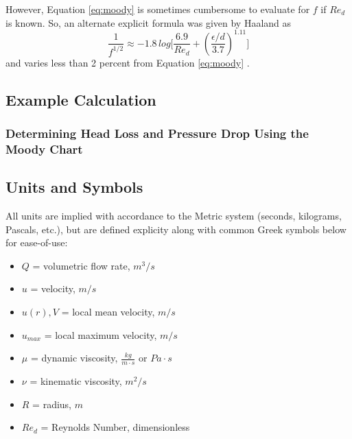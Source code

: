 \documentclass[10pt]{article} %
\numberwithin{equation}{section} %
\begin{document}
\begin{multicols}{2}
However, Equation \ref{eq:moody} is sometimes cumbersome to evaluate for $f$ if $Re_{d}$ is known. So, an alternate explicit formula was given by Haaland as
\begin{equation}
\frac{1}{f^{1/2}} \approx -1.8\, log \big[ \frac{6.9}{Re_{d}} + \left( \frac{\epsilon / d}{3.7} \right)^{1.11} \big]
\end{equation}
and varies less than 2 percent from Equation \ref{eq:moody} \cite{fluid-mechanics}.

\subsection{Example Calculation}
\subsubsection{Determining Head Loss and Pressure Drop Using the Moody Chart}

\subsection{Units and Symbols} \label{sec:units}
All units are implied with accordance to the Metric system (seconds, kilograms, Pascals, etc.), but are defined explicity along with common Greek symbols below for ease-of-use:
\begin{itemize}%
\item $Q$ = volumetric flow rate, $m^{3}/s$
\item $u$ = velocity, $m/s$ 
\item $u(r), V$ = local mean velocity, $m/s$ 
\item $u_{max}$ = local maximum velocity, $m/s$ 
\item $\mu$ = dynamic viscosity, $\frac{kg}{m \cdot s}$ or $Pa \cdot s$
\item $\nu$ = kinematic viscosity, $m^{2}/s$
\item $R$ = radius, $m$
\item $Re_{d}$ = Reynolds Number, dimensionless%

\end{itemize}
\end{multicols}
\printbibliography
\end{document}

